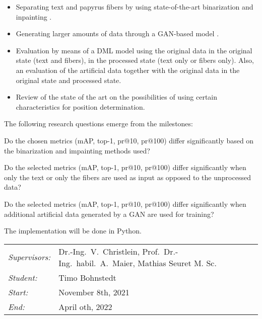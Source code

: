 \documentclass[12pt,a4paper]{article}
\begin{document}
\begin{itemize}
	\item Separating text and papyrus fibers by using state-of-the-art binarization \cite{Tensmeyer20} and inpainting \cite{Liu18Impainting}.
	
	\item Generating larger amounts of data through a GAN-based model \cite{Goodfellow14, Tamrin21}.
	
	\item  Evaluation by means of a DML model using the original data in the original state (text and fibers), in the processed state (text only or fibers only). Also, an evaluation of the artificial data together with the original data in the original state and processed state.
	
	\item Review of the state of the art on the possibilities of using certain characteristics for position determination.      	      	      
\end{itemize}
		
The following research questions emerge from the milestones:

\begin{questions}
	\item Do the chosen metrics (mAP, top-1, pr@10, pr@100) differ significantly based on the binarization and impainting methods used?
	
	\item  Do the selected metrics (mAP, top-1, pr@10, pr@100) differ significantly when only the text or only the fibers are used as input as opposed to the unprocessed data?  
	
	\item  Do the selected metrics (mAP, top-1, pr@10, pr@100) differ significantly when additional artificial data generated by a GAN are used for training?
\end{questions}

		
The implementation will be done in Python.\\
		
\begin{tabular}{ll}
	\emph{Supervisors:} & Dr.-Ing.~V.~Christlein,  Prof.~Dr.-Ing.~habil.~A.~Maier, Mathias Seuret M. Sc.
	\\
	\emph{Student:}     & Timo Bohnstedt
	\\
	\emph{Start:}       & November 8th, 2021                                            \\
	\emph{End:}         & April oth, 2022                                        \\
\end{tabular}
\nopagebreak[4]
\small

		
\end{document}
